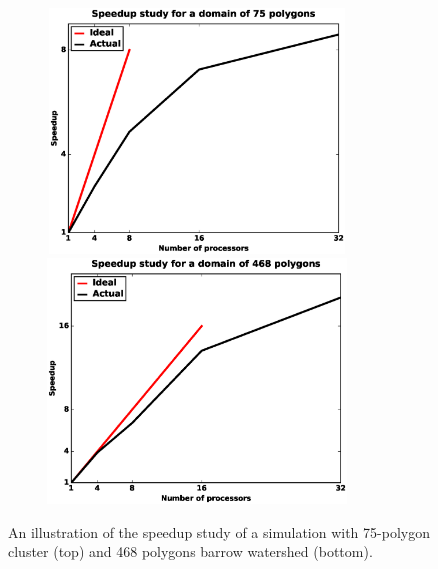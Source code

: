 \documentclass[review,11pt]{elsarticle}
\begin{document}
\begin{figure}[!htpb]
\centering
\includegraphics[height = 6.5cm, width=10cm]{figures/speedup-lcs-lobster.eps}
\includegraphics[height = 6.5cm, width=10cm]{figures/speedup-lcs-barrow.eps}
\caption{An illustration of the speedup study of a simulation with 75-polygon cluster (top) and 468 polygons barrow watershed (bottom).}
\label{lcs-speed}
\end{figure}
\end{document}
